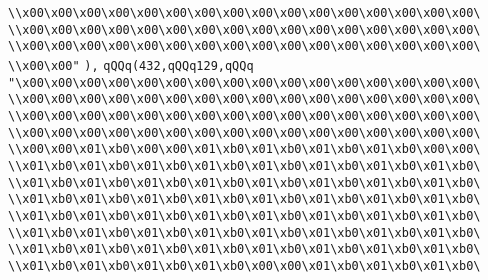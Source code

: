 \verb|\\x00\x00\x00\x00\x00\x00\x00\x00\x00\x00\x00\x00\x00\x00\x00\x00\|\newline
\verb|\\x00\x00\x00\x00\x00\x00\x00\x00\x00\x00\x00\x00\x00\x00\x00\x00\|\newline
\verb|\\x00\x00\x00\x00\x00\x00\x00\x00\x00\x00\x00\x00\x00\x00\x00\x00\|\newline
\verb|\\x00\x00"|\newline
\verb|),|\newline
\verb|qQQq(432,qQQq129,qQQq|\newline
\verb|"\x00\x00\x00\x00\x00\x00\x00\x00\x00\x00\x00\x00\x00\x00\x00\x00\|\newline
\verb|\\x00\x00\x00\x00\x00\x00\x00\x00\x00\x00\x00\x00\x00\x00\x00\x00\|\newline
\verb|\\x00\x00\x00\x00\x00\x00\x00\x00\x00\x00\x00\x00\x00\x00\x00\x00\|\newline
\verb|\\x00\x00\x00\x00\x00\x00\x00\x00\x00\x00\x00\x00\x00\x00\x00\x00\|\newline
\verb|\\x00\x00\x01\xb0\x00\x00\x01\xb0\x01\xb0\x01\xb0\x01\xb0\x00\x00\|\newline
\verb|\\x01\xb0\x01\xb0\x01\xb0\x01\xb0\x01\xb0\x01\xb0\x01\xb0\x01\xb0\|\newline
\verb|\\x01\xb0\x01\xb0\x01\xb0\x01\xb0\x01\xb0\x01\xb0\x01\xb0\x01\xb0\|\newline
\verb|\\x01\xb0\x01\xb0\x01\xb0\x01\xb0\x01\xb0\x01\xb0\x01\xb0\x01\xb0\|\newline
\verb|\\x01\xb0\x01\xb0\x01\xb0\x01\xb0\x01\xb0\x01\xb0\x01\xb0\x01\xb0\|\newline
\verb|\\x01\xb0\x01\xb0\x01\xb0\x01\xb0\x01\xb0\x01\xb0\x01\xb0\x01\xb0\|\newline
\verb|\\x01\xb0\x01\xb0\x01\xb0\x01\xb0\x01\xb0\x01\xb0\x01\xb0\x01\xb0\|\newline
\verb|\\x01\xb0\x01\xb0\x01\xb0\x01\xb0\x00\x00\x01\xb0\x01\xb0\x01\xb0\|\newline
